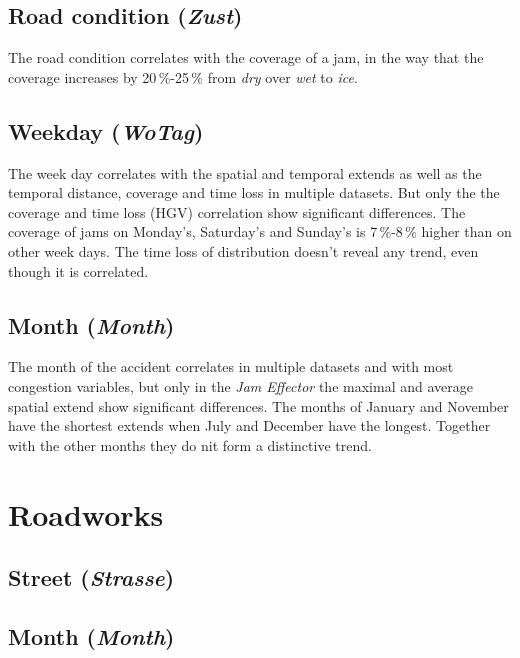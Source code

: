 \subsection{Road condition (\textit{Zust})}
The road condition correlates with the coverage of a jam, in the way that the coverage increases by 20\,\%-25\,\% from \textit{dry} over \textit{wet} to \textit{ice}.

\subsection{Weekday (\textit{WoTag})}
The week day correlates with the spatial and temporal extends as well as the temporal distance, coverage and time loss in multiple datasets. But only the the coverage and time loss (HGV) correlation show significant differences. The coverage of jams on Monday's, Saturday's and Sunday's is 7\,\%-8\,\% higher than on other week days. The time loss of distribution doesn't reveal any trend, even though it is correlated.

\subsection{Month (\textit{Month})}
The month of the accident correlates in multiple datasets and with most congestion variables, but only in the \textit{Jam Effector} the maximal and average spatial extend show significant differences. The months of January and November have the shortest extends when July and December have the longest. Together with the other months they do nit form a distinctive trend. 

\section{Roadworks}

\subsection{Street (\textit{Strasse})}

\subsection{Month (\textit{Month})}


